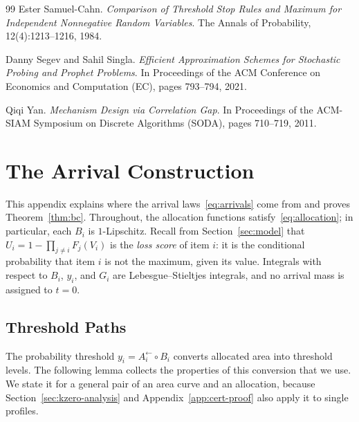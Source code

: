 \documentclass[11pt]{article}
\theoremstyle{definition}
\theoremstyle{remark}
\begin{document}
\begin{thebibliography}{99}
Ester Samuel-Cahn.
\emph{Comparison of Threshold Stop Rules and Maximum for Independent Nonnegative Random Variables}.
The Annals of Probability, 12(4):1213--1216, 1984.

Danny Segev and Sahil Singla.
\emph{Efficient Approximation Schemes for Stochastic Probing and Prophet Problems}.
In Proceedings of the ACM Conference on Economics and Computation (EC), pages 793--794, 2021.

Qiqi Yan.
\emph{Mechanism Design via Correlation Gap}.
In Proceedings of the ACM-SIAM Symposium on Discrete Algorithms (SODA), pages 710--719, 2011.


\end{thebibliography}

\newpage

\appendix

\section{The Arrival Construction}\label{app:algorithm}

This appendix explains where the arrival laws~\eqref{eq:arrivals} come from and proves Theorem~\ref{thm:bc}.
Throughout, the allocation functions satisfy~\eqref{eq:allocation}; in particular, each $B_i$ is $1$-Lipschitz.
Recall from Section~\ref{sec:model} that $U_i=1-\prod_{j\ne i}F_j(V_i)$ is the \emph{loss score} of item $i$: it is the conditional probability that item $i$ is not the maximum, given its value.
Integrals with respect to $B_i$, $y_i$, and $G_i$ are Lebesgue--Stieltjes integrals, and no arrival mass is assigned to $t=0$.

\subsection{Threshold Paths}

The probability threshold $y_i=A_i^\leftarrow\circ B_i$ converts allocated area into threshold levels.
The following lemma collects the properties of this conversion that we use.
We state it for a general pair of an area curve and an allocation, because Section~\ref{sec:kzero-analysis} and Appendix~\ref{app:cert-proof} also apply it to single profiles.
\end{document}
